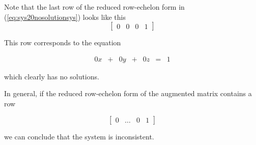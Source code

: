 \documentclass{ximera}
\begin{document}
\begin{observation}\label{ob:inconsistent} Note that the last row of the reduced row-echelon form in (\ref{eq:sys20nosolutionsys}) looks like this
$$\left[\begin{array}{ccc|c} 
 0&0&0&1
 \end{array}\right]$$

 This row corresponds to the equation

 $$\begin{array}{ccccccc}
     0x&+ &0y&+&0z&=&1
    \end{array}$$

 which clearly has no solutions. 
  
 In general, if the reduced row-echelon form of the augmented matrix contains a row

 $$\left[\begin{array}{ccc|c} 
 0&\ldots&0&1
 \end{array}\right]$$

 we can conclude that the system is inconsistent.
\end{observation}
 
\end{document}

